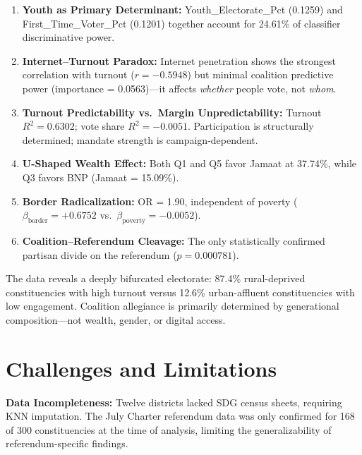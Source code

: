 \documentclass[conference]{IEEEtran}
\begin{document}
\begin{enumerate}
    \item \textbf{Youth as Primary Determinant:} Youth\_Electorate\_Pct (0.1259) and First\_Time\_Voter\_Pct (0.1201) together account for 24.61\% of classifier discriminative power.

    \item \textbf{Internet--Turnout Paradox:} Internet penetration shows the strongest correlation with turnout ($r = -0.5948$) but minimal coalition predictive power (importance = 0.0563)---it affects \emph{whether} people vote, not \emph{whom}.

    \item \textbf{Turnout Predictability vs.\ Margin Unpredictability:} Turnout $R^2 = 0.6302$; vote share $R^2 = -0.0051$. Participation is structurally determined; mandate strength is campaign-dependent.

    \item \textbf{U-Shaped Wealth Effect:} Both Q1 and Q5 favor Jamaat at 37.74\%, while Q3 favors BNP (Jamaat = 15.09\%).

    \item \textbf{Border Radicalization:} OR = 1.90, independent of poverty ($\beta_{\text{border}} = +0.6752$ vs.\ $\beta_{\text{poverty}} = -0.0052$).

    \item \textbf{Coalition--Referendum Cleavage:} The only statistically confirmed partisan divide on the referendum ($p = 0.000781$).
\end{enumerate}

The data reveals a deeply bifurcated electorate: 87.4\% rural-deprived constituencies with high turnout versus 12.6\% urban-affluent constituencies with low engagement. Coalition allegiance is primarily determined by generational composition---not wealth, gender, or digital access.

\section{Challenges and Limitations}

\textbf{Data Incompleteness:} Twelve districts lacked SDG census sheets, requiring KNN imputation. The July Charter referendum data was only confirmed for 168 of 300 constituencies at the time of analysis, limiting the generalizability of referendum-specific findings.
\end{document}
